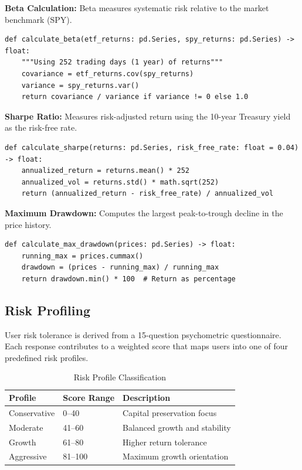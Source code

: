 \textbf{Beta Calculation:}
Beta measures systematic risk relative to the market benchmark (SPY).
\begin{lstlisting}[style=pythonstyle, caption={Beta Calculation}]
def calculate_beta(etf_returns: pd.Series, spy_returns: pd.Series) -> float:
    """Using 252 trading days (1 year) of returns"""
    covariance = etf_returns.cov(spy_returns)
    variance = spy_returns.var()
    return covariance / variance if variance != 0 else 1.0
\end{lstlisting}

\textbf{Sharpe Ratio:}
Measures risk-adjusted return using the 10-year Treasury yield as the risk-free rate.
\begin{lstlisting}[style=pythonstyle, caption={Sharpe Ratio Calculation}]
def calculate_sharpe(returns: pd.Series, risk_free_rate: float = 0.04) -> float:
    annualized_return = returns.mean() * 252
    annualized_vol = returns.std() * math.sqrt(252)
    return (annualized_return - risk_free_rate) / annualized_vol
\end{lstlisting}

\textbf{Maximum Drawdown:}
Computes the largest peak-to-trough decline in the price history.
\begin{lstlisting}[style=pythonstyle, caption={Maximum Drawdown Calculation}]
def calculate_max_drawdown(prices: pd.Series) -> float:
    running_max = prices.cummax()
    drawdown = (prices - running_max) / running_max
    return drawdown.min() * 100  # Return as percentage
\end{lstlisting}

\subsection{Risk Profiling}

User risk tolerance is derived from a 15-question psychometric questionnaire. Each response contributes to a weighted score that maps users into one of four predefined risk profiles.

\begin{table}[H]
\centering
\begin{tabular}{lll}
\toprule
\textbf{Profile} & \textbf{Score Range} & \textbf{Description} \\
\midrule
Conservative & 0--40 & Capital preservation focus \\
Moderate     & 41--60 & Balanced growth and stability \\
Growth       & 61--80 & Higher return tolerance \\
Aggressive   & 81--100 & Maximum growth orientation \\
\bottomrule
\end{tabular}
\caption{Risk Profile Classification}
\label{tab:risk_profiles}
\end{table}


